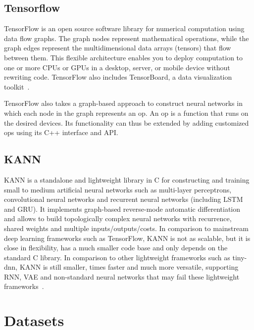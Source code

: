 \subsection{Tensorflow}
TensorFlow is an open source software library for numerical computation using 
data flow graphs. The graph nodes represent mathematical operations, while the 
graph edges represent the multidimensional data arrays (tensors) that flow 
between them.  This flexible architecture enables you to deploy computation to 
one or more CPUs or GPUs in a desktop, server, or mobile device without 
rewriting code. TensorFlow also includes TensorBoard, a data visualization 
toolkit~\cite{tensorflow}.

TensorFlow also takes a graph-based approach to construct neural networks in 
which each node in the graph represents an op. An op is a function that runs on 
the desired devices. Its functionality can thus be extended by adding customized 
ops using its C++ interface and API.

\subsection{KANN}
\label{sec:kann}
KANN is a standalone and lightweight library in C for constructing and training 
small to medium artificial neural networks such as multi-layer perceptrons, 
convolutional neural networks and recurrent neural networks (including LSTM and 
GRU).  It implements graph-based reverse-mode automatic differentiation and 
allows to build topologically complex neural networks with recurrence, shared 
weights and multiple inputs/outputs/costs. In comparison to mainstream deep 
learning frameworks such as TensorFlow, KANN is not as scalable, but it is close 
in flexibility, has a much smaller code base and only depends on the standard C 
library. In comparison to other lightweight frameworks such as tiny-dnn, KANN is 
still smaller, times faster and much more versatile, supporting RNN, VAE and 
non-standard neural networks that may fail these lightweight 
frameworks~\cite{kann}.

\section{Datasets}
